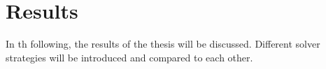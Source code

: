 \chapter{Results}
\label{sec:results}

In th following, the results of the thesis will be discussed.
Different solver strategies will be introduced and compared to each other.


